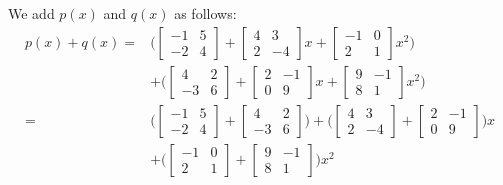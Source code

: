We add $p(x)$ and $q(x)$ as follows:
\begin{align*}
p(x) + q(x) =&\bigg( \begin{bmatrix} 
-1 & 5  \\
-2 & 4 
\end{bmatrix}
+\begin{bmatrix} 
4 & 3 \\
2 & -4 
\end{bmatrix}
 x+\begin{bmatrix} 
-1 & 0 \\
2 & 1 
\end{bmatrix}
 x^2\bigg)\\
&+\bigg(\begin{bmatrix} 
4 & 2 \\
-3 & 6
\end{bmatrix}
+\begin{bmatrix} 
2 & -1 \\
0 & 9 
\end{bmatrix}
 x+\begin{bmatrix} 
9 & -1 \\
8 & 1 
\end{bmatrix}
 x^2\bigg)\\
= &\bigg(\begin{bmatrix} 
-1 & 5 \\
-2 & 4
\end{bmatrix}
+\begin{bmatrix} 
4 & 2 \\
-3 & 6 
\end{bmatrix}\bigg)
 +\bigg(\begin{bmatrix} 
4 & 3 \\
2 & -4 
\end{bmatrix}
+\begin{bmatrix}
2 & -1\\
0 & 9
\end{bmatrix}\bigg)x\\
&+\bigg(\begin{bmatrix}
-1 & 0 \\
2 & 1
\end{bmatrix}
+\begin{bmatrix} 
9 & -1 \\
8 & 1 
\end{bmatrix}\bigg)
 x^2\\

\end{align*}
